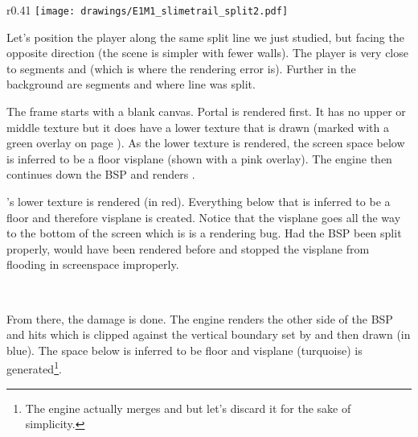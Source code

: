 \begin{minipage}{0.47\textwidth}
\end{minipage}
\hspace{4mm}
\begin{minipage}{0.47\textwidth}
\end{minipage} 
\par
\vspace{1mm}
\par



\par
\begin{wrapfigure}[20]{r}{0.41\textwidth}
\centering
\texttt{[image: drawings/E1M1\_slimetrail\_split2.pdf]}
\end{wrapfigure}
\par
\vspace{10pt}
Let's position the player along the same split line we just studied, but facing the opposite direction (the scene is simpler with fewer walls). The player is very close to segments  and  (which is where the rendering error is). Further in the background are segments  and  where line  was split.\par
\vspace{10pt}
The frame starts with a blank canvas. Portal  is rendered first. It has no upper or middle texture but it does have a lower texture that is drawn (marked with a green overlay on page \pageref{leak_opposite_explained.png}). As the lower texture is rendered, the screen space below is inferred to be a floor visplane  (shown with a pink overlay). The engine then continues down the BSP and renders .\par
\vspace{10pt}

 's lower texture is rendered (in red). Everything below that is inferred to be a floor and therefore visplane  is created. Notice that the visplane goes all the way to the bottom of the screen which is is a rendering bug. Had the BSP been split properly,  would have been rendered before  and stopped the visplane from flooding in screenspace improperly.\\
\par
 

\\
\label{leak_opposite_explained.png}
\par
From there, the damage is done. The engine renders the other side of the BSP and hits  which is clipped against the vertical boundary set by  and then drawn (in blue). The space below  is inferred to be floor and visplane  (turquoise) is generated\footnote{The engine actually merges  and  but let's discard it for the sake of simplicity.}.


